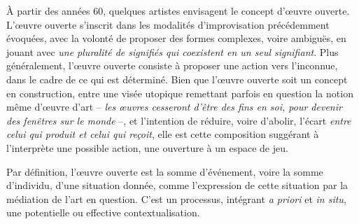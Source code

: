 \documentclass{article}
\begin{document}
À partir des années 60, quelques artistes envisagent le concept d'œuvre ouverte. L'œuvre ouverte s'inscrit dans les modalités d'improvisation précédemment évoquées, avec la volonté de proposer des formes complexes, voire ambiguës, en jouant avec \textit{une pluralité de signifiés qui coexistent en un seul signifiant}. %
Plus généralement, l'œuvre ouverte consiste à proposer une action vers l'inconnue, dans le cadre de ce qui est déterminé. 
Bien que l'œuvre ouverte soit un concept en construction, entre une visée utopique remettant parfois en question la notion même d'œuvre d'art -- \textit{les œuvres cesseront d'être des fins en soi, pour devenir des fenêtres sur le monde} --, et l'intention de réduire, voire d'abolir, l'écart \textit{entre celui qui produit et celui qui reçoit}, elle est cette composition suggérant à l'interprète une possible action, une ouverture à un espace de jeu. 


Par définition, l'œuvre ouverte est la somme d'événement, voire la somme d'individu, d'une situation donnée, comme l'expression de cette situation par la médiation de l'art en question. C'est un processus, intégrant \textit{a priori} et \textit{in situ}, une potentielle ou effective contextualisation.
\end{document}
